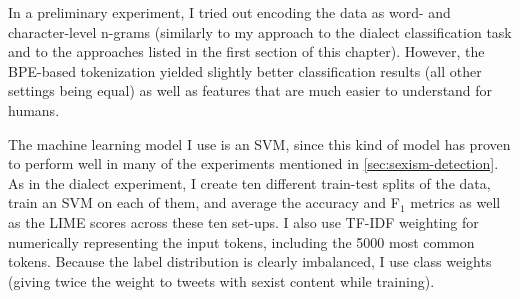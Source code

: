 In a preliminary experiment, I tried out encoding the data as word- and character-level n-grams (similarly to my approach to the dialect classification task and to the approaches listed in the first section of this chapter).
However, the BPE-based tokenization yielded slightly better classification results (all other settings being equal) as well as features that are much easier to understand for humans.

The machine learning model I use is an SVM, since this kind of model has proven to perform well in many of the experiments mentioned in \autoref{sec:sexism-detection}.
As in the dialect experiment, I create ten different train-test splits of the data, train an SVM on each of them, and average the accuracy and F$_1$ metrics as well as the LIME scores across these ten set-ups.
I also use TF-IDF weighting for numerically representing the input tokens, including the 5000 most common tokens.
Because the label distribution is clearly imbalanced, I use class weights (giving twice the weight to tweets with sexist content while training).


